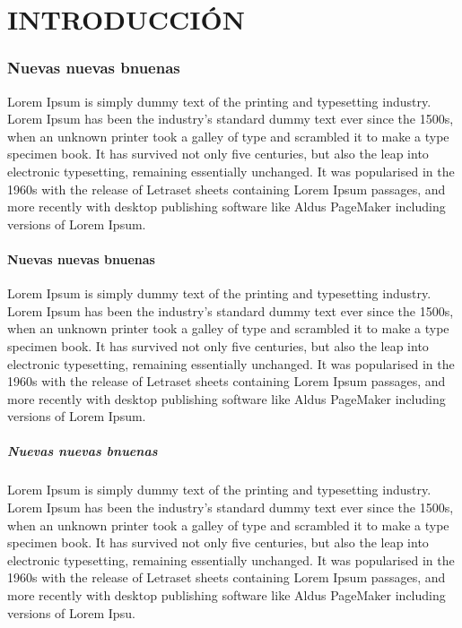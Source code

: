 \documentclass[12pt,a4paper,final]{book}
\newcommand\titulodc{\fontsize{16pt}{16pt}\selectfont}
\newcommand\titulosndc{\fontsize{14pt}{14pt}\selectfont}
\newcommand\titulotndc{\fontsize{12pt}{12pt}\selectfont}
\begin{document}
	
		
	\newpage{\ }
	\thispagestyle{empty}
	
	
	
	
	\part{{\titulodc INTRODUCCIÓN}}
	
	\section{\titulosndc Nuevas nuevas bnuenas}


	
	\par{Lorem Ipsum is simply dummy text of the printing and typesetting industry. Lorem Ipsum has been the industry's standard dummy text ever since the 1500s, when an unknown printer took a galley of type and scrambled it to make a type specimen book. It has survived not only five centuries, but also the leap into electronic typesetting, remaining essentially unchanged. It was popularised in the 1960s with the release of Letraset sheets containing Lorem Ipsum passages, and more recently with desktop publishing software like Aldus PageMaker including versions of Lorem Ipsum.}  
	
		\subsection{\titulosndc Nuevas nuevas bnuenas}
	
	\par{Lorem Ipsum is simply dummy text of the printing and typesetting industry. Lorem Ipsum has been the industry's standard dummy text ever since the 1500s, when an unknown printer took a galley of type and scrambled it to make a type specimen book. It has survived not only five centuries, but also the leap into electronic typesetting, remaining essentially unchanged. It was popularised in the 1960s with the release of Letraset sheets containing Lorem Ipsum passages, and more recently with desktop publishing software like Aldus PageMaker including versions of Lorem Ipsum.}
	
		\subsubsection{\titulotndc Nuevas nuevas bnuenas}
	
	\par{Lorem Ipsum is simply dummy text of the printing and typesetting industry. Lorem Ipsum has been the industry's standard dummy text ever since the 1500s, when an unknown printer took a galley of type and scrambled it to make a type specimen book. It has survived not only five centuries, but also the leap into electronic typesetting, remaining essentially unchanged. It was popularised in the 1960s with the release of Letraset sheets containing Lorem Ipsum passages, and more recently with desktop publishing software like Aldus PageMaker including versions of Lorem Ipsu.}
	
		

	
\end{document}
